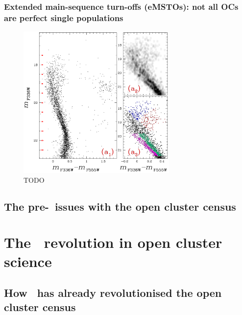 \subsubsection{Extended main-sequence turn-offs (eMSTOs): not all OCs are perfect single populations}

\begin{figure}[tb]
	\centering
	\includegraphics[width=0.7\textwidth]{fig/c1/emsto.png}
	\caption[TODO]{TODO}
	\label{fig:intro:history:emsto}
\end{figure}

\subsection{The pre-\gaia\ issues with the open cluster census}
\label{sec:intro:history:issues}






\section{The \gaia\ revolution in open cluster science}
\label{sec:intro:gaia}




\subsection{How \gaia\ has already revolutionised the open cluster census}
\label{sec:intro:gaia:census}


